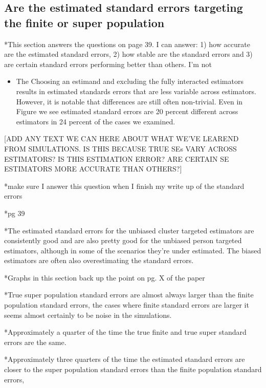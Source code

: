 \documentclass[
]{article}
\providecommand{\tightlist}{%
  \setlength{\itemsep}{0pt}\setlength{\parskip}{0pt}}
\begin{document}
\subsection{Are the estimated standard errors targeting the finite or
super
population}\label{are-the-estimated-standard-errors-targeting-the-finite-or-super-population}

*This section answers the questions on page 39. I can answer: 1) how
accurate are the estimated standard errors, 2) how stable are the
standard errors and 3) are certain standard errors performing better
than others. I'm not

\begin{itemize}
\tightlist
\item
  The Choosing an estimand and excluding the fully interacted estimators
  results in estimated standards errors that are less variable across
  estimators. However, it is notable that differences are still often
  non-trivial. Even in Figure we see estimated standard errors are 20
  percent different across estimators in 24 percent of the cases we
  examined.
\end{itemize}

{[}ADD ANY TEXT WE CAN HERE ABOUT WHAT WE'VE LEAREND FROM SIMULATIONS.
IS THIS BECAUSE TRUE SEs VARY ACROSS ESTIMATORS? IS THIS ESTIMATION
ERROR? ARE CERTAIN SE ESTIMATORS MORE ACCURATE THAN OTHERS?{]}

*make sure I answer this question when I finish my write up of the
standard errors

*pg 39

*The estimated standard errors for the unbiased cluster targeted
estimators are consistently good and are also pretty good for the
unbiased person targeted estimators, although in some of the scenarios
they're under estimated. The biased estimators are often also
overestimating the standard errors.

*Graphs in this section back up the point on pg. X of the paper

*True super population standard errors are almost always larger than the
finite population standard errors, the cases where finite standard
errors are larger it seems almost certainly to be noise in the
simulations.

*Approximately a quarter of the time the true finite and true super
standard errors are the same.

*Approximately three quarters of the time the estimated standard errors
are closer to the super population standard errors than the finite
population standard errors,
\end{document}
